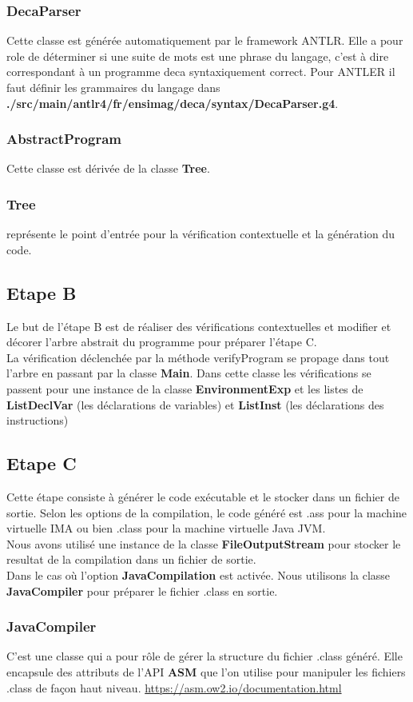 \documentclass[12pt, a4paper, one side]{article}
\begin{document}
    \subsubsection{DecaParser} Cette classe est générée automatiquement par le framework ANTLR. Elle a pour role de déterminer si une suite de mots est une phrase du langage, c'est à dire correspondant à un programme deca syntaxiquement correct. Pour ANTLER il faut définir les grammaires du langage dans \textbf{./src/main/antlr4/fr/ensimag/deca/syntax/DecaParser.g4}.
    \subsubsection{AbstractProgram} Cette classe est dérivée de la classe \textbf{Tree}.

    \subsubsection{Tree} représente le point d'entrée pour la vérification contextuelle et la génération du code.

    \subsection{Etape B}
    Le but de l'étape B est de réaliser des vérifications contextuelles et modifier et décorer l'arbre abstrait du programme pour préparer l'étape C.
    \\
    La vérification déclenchée par la méthode verifyProgram se propage dans tout l'arbre en passant par la classe \textbf{Main}. Dans cette classe les vérifications se passent pour une instance de la classe \textbf{EnvironmentExp} et les listes de \textbf{ListDeclVar} (les déclarations de variables) et \textbf{ListInst} (les déclarations des instructions)

    \subsection{Etape C}
    Cette étape consiste à générer le code exécutable et le stocker dans un fichier de sortie. Selon les options de la compilation, le code généré est .ass pour la machine virtuelle IMA ou bien .class pour la machine virtuelle Java JVM.
    \\
    Nous avons utilisé une instance de la classe \textbf{FileOutputStream} pour stocker le resultat de la compilation dans un fichier de sortie.\\
    Dans le cas où l'option \textbf{JavaCompilation} est activée. Nous utilisons la classe \textbf{JavaCompiler} pour préparer le fichier .class en sortie.

    \subsubsection{JavaCompiler}
    C'est une classe qui a pour rôle de gérer la structure du fichier .class généré. Elle encapsule des attributs de l'API \textbf{ASM} que l'on utilise pour manipuler les fichiers .class de façon haut niveau. \url{https://asm.ow2.io/documentation.html}
\end{document}
